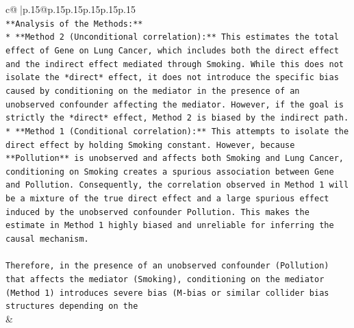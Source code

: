 \documentclass{article}
\begin{document}
{\begin{supertabular}{c@{$\;$}|p{.15\linewidth}@{}p{.15\linewidth}p{.15\linewidth}p{.15\linewidth}p{.15\linewidth}p{.15\linewidth}}
{{{\\ 
\texttt{**Analysis of the Methods:**} \\
\texttt{*   **Method 2 (Unconditional correlation):** This estimates the total effect of Gene on Lung Cancer, which includes both the direct effect and the indirect effect mediated through Smoking. While this does not isolate the *direct* effect, it does not introduce the specific bias caused by conditioning on the mediator in the presence of an unobserved confounder affecting the mediator. However, if the goal is strictly the *direct* effect, Method 2 is biased by the indirect path.} \\
\texttt{*   **Method 1 (Conditional correlation):** This attempts to isolate the direct effect by holding Smoking constant. However, because **Pollution** is unobserved and affects both Smoking and Lung Cancer, conditioning on Smoking creates a spurious association between Gene and Pollution. Consequently, the correlation observed in Method 1 will be a mixture of the true direct effect and a large spurious effect induced by the unobserved confounder Pollution. This makes the estimate in Method 1 highly biased and unreliable for inferring the causal mechanism.} \\
\\ 
\texttt{Therefore, in the presence of an unobserved confounder (Pollution) that affects the mediator (Smoking), conditioning on the mediator (Method 1) introduces severe bias (M{-}bias or similar collider bias structures depending on the} \\
            }
        }
    }
    & \\ \\


\end{supertabular}}
\end{document}
